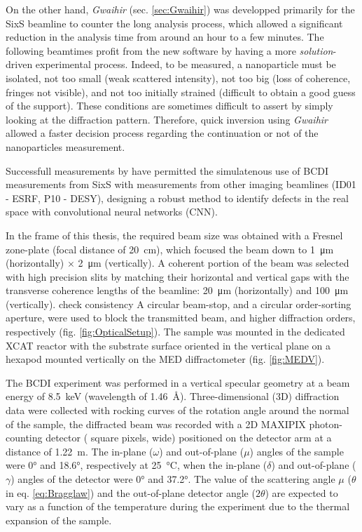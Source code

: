 On the other hand, \textit{Gwaihir} (sec. \ref{sec:Gwaihir}) was developped primarily for the SixS beamline to counter the long analysis process, which allowed a significant reduction in the analysis time from around an hour to a few minutes.
The following beamtimes profit from the new software by having a more \textit{solution}-driven experimental process.
Indeed, to be measured, a nanoparticle must be isolated, not too small (weak scattered intensity), not too big (loss of coherence, fringes not visible), and not too initially strained (difficult to obtain a good guess of the support).
These conditions are sometimes difficult to assert by simply looking at the diffraction pattern.
Therefore, quick inversion using \textit{Gwaihir} allowed a faster decision process regarding the continuation or not of the nanoparticles measurement.

Successfull measurements by \cite{Lim2021} have permitted the simulatenous use of BCDI measurements from SixS with measurements from other imaging beamlines (ID01 - ESRF, P10 - DESY), designing a robust method to identify defects in the real space with convolutional neural networks (CNN).

In the frame of this thesis, the required beam size was obtained with a Fresnel zone-plate (focal distance of \qty{20}{\cm}), which focused the beam down to \qty{1}{\um} (horizontally) $\times$ \qty{2}{\um} (vertically).
A coherent portion of the beam was selected with high precision slits by matching their horizontal and vertical gaps with the transverse coherence lengths of the beamline: \qty{20}{\um} (horizontally) and \qty{100}{\um} (vertically).
\textcolor{Important}{check consistency}
A circular beam-stop, and a circular order-sorting aperture, were used to block the transmitted beam, and higher diffraction orders, respectively (fig. \ref{fig:OpticalSetup}).
The sample was mounted in the dedicated XCAT reactor with the substrate surface oriented in the vertical plane on a hexapod mounted vertically on the MED diffractometer (fig. \ref{fig:MEDV}).

The BCDI experiment was performed in a vertical specular geometry at a beam energy of \qty{8.5}{\keV} (wavelength of \qty{1.46}{\angstrom}).
Three-dimensional (3D) diffraction data were collected with rocking curves of the rotation angle around the normal of the sample, the diffracted beam was recorded with a 2D MAXIPIX photon-counting detector ( square pixels,  wide) positioned on the detector arm at a distance of \qty{1.22}{\meter}.
The in-plane ($\omega$) and out-of-plane ($\mu$) angles of the sample were \ang{0} and \ang{18.6}, respectively at \qty{25}{\degreeCelsius}, when the in-plane ($\delta$) and out-of-plane ($\gamma$) angles of the detector were \ang{0} and \ang{37.2}.
The value of the scattering angle $\mu$ ($\theta$ in eq. \ref{eq:Bragglaw}) and the out-of-plane detector angle ($2\theta$) are expected to vary as a function of the temperature during the experiment due to the thermal expansion of the sample.

